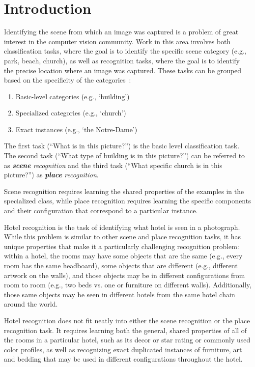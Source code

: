
\chapter{Introduction}
\label{ch:1}

Identifying the scene from which an image was captured is a problem of great interest in the computer vision community. Work in this area involves both classification tasks, where the goal is to identify the specific scene category (e.g., park, beach, church), as well as recognition tasks, where the goal is to identify the precise location where an image was captured. These tasks can be grouped based on the specificity of the categories~\cite{grauman_leibe_2011}:

\begin{enumerate}
    \item Basic-level categories (e.g., `building')
    \item Specialized categories (e.g., `church')
    \item Exact instances (e.g., `the Notre-Dame')
\end{enumerate}

The first task (``What is in this picture?'') is the basic level classification task. The second task (``What type of building is in this picture?'') can be referred to as \emph{\textbf{scene} recognition} and the third task (``What specific church is in this picture?'') as \emph{\textbf{place} recognition}.

Scene recognition requires learning the shared properties of the examples in the specialized class, while place recognition requires learning the specific components and their configuration that correspond to a particular instance.

Hotel recognition is the task of identifying what hotel is seen in a photograph. While this problem is similar to other scene and place recognition tasks, it has unique properties that make it a particularly challenging recognition problem: within a hotel, the rooms may have some objects that are the same (e.g., every room has the same headboard), some objects that are different (e.g., different artwork on the walls), and those objects may be in different configurations from room to room (e.g., two beds vs. one or furniture on different walls). Additionally, those same objects may be seen in different hotels from the same hotel chain around the world.

Hotel recognition does not fit neatly into either the scene recognition or the place recognition task. It requires learning both the general, shared properties of all of the rooms in a particular hotel, such as its decor or star rating or commonly used color profiles, as well as recognizing exact duplicated instances of furniture, art and bedding that may be used in different configurations throughout the hotel.

